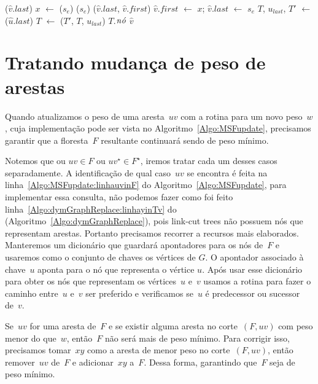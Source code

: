 \begin{algorithm}[htb]
\caption{\LCOCycle($\hat v$, $s_e$)}
\label{Algo:LCOCycle}
\begin{algorithmic}[1]
\State \linkcutEvert($\hat v$.$last$)
\State\Return
\EndIf
\State $x$ $\gets$ \linkcutParent($s_e$)
\State \linkcutDelEdge($s_e$)
\State \linkcutAddEdge($\hat v$.$last$, $\hat v$.$first$)
\State $\hat v$.$first$ $\gets$ $x$; $\hat v$.$last$ $\gets$ $s_e$
\State $T$, $u_{last}$, $T'$ $\gets$ \treapSplit($\hat u$.$last$)
\State $T$ $\gets$ \treapJoin($T'$, $T$, $u_{last}$)
\State $T$.$\mathit{n\acute{o}}$ $\hat v$
\end{algorithmic}
\end{algorithm}


\section{Tratando mudança de peso de arestas}

Quando atualizamos o peso de uma aresta~$uv$ com a rotina \MSFupdate{} para um novo peso~$w$, cuja implementação pode ser vista no Algoritmo~\ref{Algo:MSFupdate}, precisamos garantir que a floresta~$F$ resultante continuará sendo  de peso mínimo.

Notemos que ou $uv\in F$ ou $uv^\star\in F^\star$, iremos tratar cada um desses casos separadamente.
A identificação de qual caso~$uv$ se encontra é feita na linha~\ref{Algo:MSFupdate:linhauvinF} do Algoritmo~\ref{Algo:MSFupdate}, para implementar essa consulta, não podemos fazer como foi feito linha~\ref{Algo:dymGraphReplace:linhayinTv} do \dymGraphReplace(Algoritmo~\ref{Algo:dymGraphReplace}), pois link-cut trees não possuem nós que representam arestas.
Portanto precisamos recorrer a recursos mais elaborados.
Manteremos um dicionário que guardará apontadores para os nós de~$F$ e usaremos como o conjunto de chaves os vértices de $G$. O apontador associado à chave~$u$ aponta para o nó que representa o vértice $u$.
Após usar esse dicionário para obter os nós que representam os vértices~$u$ e~$v$ usamos a rotina \linkcutPath{} para fazer o caminho entre~$u$ e~$v$ ser preferido e verificamos se~$u$ é predecessor ou sucessor de~$v$.

Se~$uv$ for uma aresta de~$F$ e se existir alguma aresta no corte~$(F, uv)$ com peso menor do que~$w$, então~$F$ não será mais de peso mínimo.
Para corrigir isso, precisamos tomar~$xy$ como a aresta de menor peso no corte~$(F, uv)$,
então remover~$uv$ de~$F$ e adicionar~$xy$ a~$F$.
Dessa forma, garantindo que~$F$ seja de peso mínimo.

